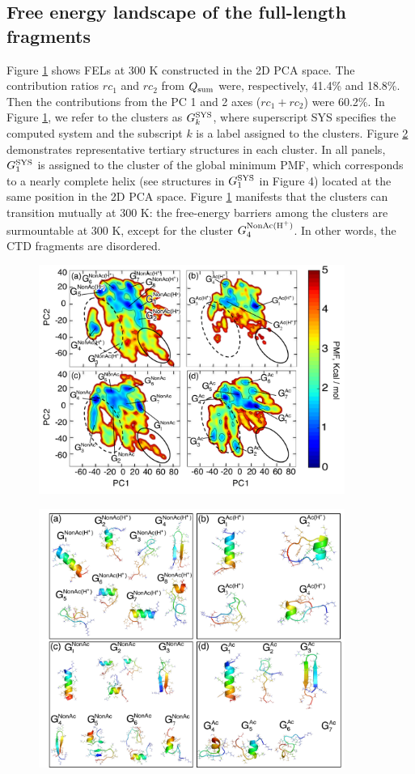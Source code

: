 \subsection{Free energy landscape of the full-length fragments}
Figure \ref{fig:fel_whole} shows FELs at 300 K constructed in the 2D PCA space. The contribution ratios $rc_1$ and $rc_2$ from $Q_{\rm sum}$ were, respectively, 41.4\% and 18.8\%. Then the contributions from the PC 1 and 2 axes ($rc_1+rc_2$) were 60.2\%. In Figure \ref{fig:fel_whole}, we refer to the clusters as $G^{\rm SYS}_k$, where superscript SYS specifies the computed system and the subscript $k$ is a label assigned to the clusters. Figure \ref{fig:fel_whole_confs} demonstrates representative tertiary structures in each cluster. In all panels, $G^{\rm SYS}_1$ is assigned to the cluster of the global minimum PMF, which corresponds to a nearly complete helix (see structures in $G^{\rm SYS}_1$ in Figure 4) located at the same position in the 2D PCA space. Figure \ref{fig:fel_whole} manifests that the clusters can transition mutually at 300 K: the free-energy barriers among the clusters are surmountable at 300 K, except for the cluster $G^{\rm NonAc(H^+)}_4$. In other words, the CTD fragments are disordered.

\begin{figure}
  \centering
  \includegraphics[width=10cm]{../single_CTD/figures_p53ctd/3.pdf}
  \caption{\label{fig:fel_whole}}
\end{figure}

\begin{figure}
  \centering
  \includegraphics[width=10cm]{../single_CTD/figures_p53ctd/4.pdf}
  \caption{\label{fig:fel_whole_confs}}
\end{figure}

